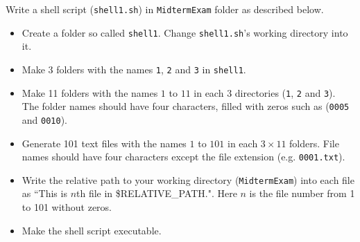 \newpage
\question[25]  

Write a shell script (\texttt{shell1.sh}) in \texttt{MidtermExam} folder as described below.
\begin{itemize}
\item Create a folder so called \texttt{shell1}. Change \texttt{shell1.sh}'s working directory into it.
\item Make 3 folders with the names \texttt{1}, \texttt{2} and \texttt{3} in \texttt{shell1}.
\item Make 11 folders with the names $1$ to $11$ in each $3$ directories (\texttt{1}, \texttt{2} and \texttt{3}). The folder names should have four characters, filled with zeros such as (\texttt{0005} and \texttt{0010}). 
\item Generate 101 text files with the names $1$ to $101$ in each $3\times11$ folders. File names should have four characters except the file extension (e.g. \texttt{0001.txt}).
\item Write the relative path to your working directory (\texttt{MidtermExam}) into each file as ``This is $n$th file in \$RELATIVE\_PATH.". Here $n$ is the file number from 1 to 101 without zeros.
\item Make the shell script executable.
\end{itemize}

